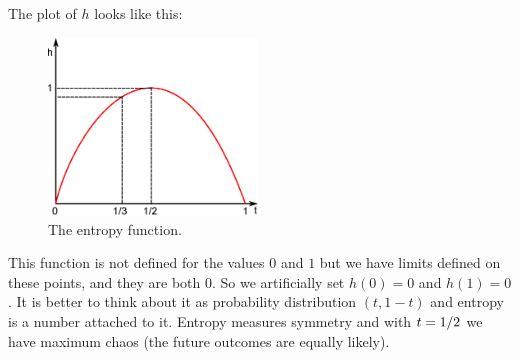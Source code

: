 The plot of $h$ looks like this:
\begin{figure}[h]
	\centering
	\includegraphics[width=210px]{pictures/ch01-i00.eps}
	\caption{The entropy function.}
\end{figure}

This function is not defined for the values $0$ and $1$ but we have limits defined on these points, and they are both $0$. So we artificially set $h(0) = 0$ and $h(1) = 0$. It is better to think about it as probability distribution $(t, 1 - t)$ and entropy is a number attached to it. Entropy measures symmetry and with $t = {1}/{2}$ we have maximum chaos (the future outcomes are equally likely).